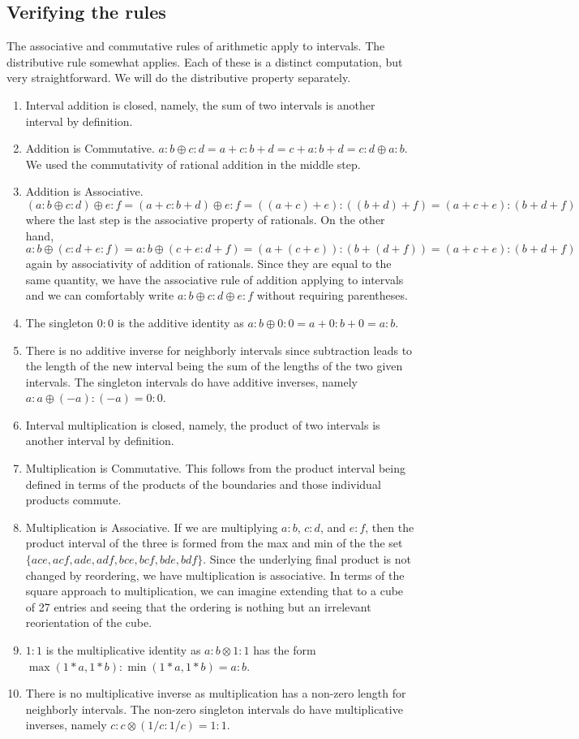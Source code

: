 \documentclass[12pt]{article}
\theoremstyle{remark}
\begin{document}
\subsection{Verifying the rules}\label{sec:rules}

The associative and commutative rules of arithmetic apply to intervals. The distributive rule somewhat applies. Each of these is a distinct computation, but very straightforward. We will do the distributive property separately. 

\begin{enumerate}
    \item Interval addition is closed, namely, the sum of two intervals is another interval by definition. 
    \item Addition is Commutative. $a:b \oplus c:d= a+c : b+d = c+a:b+d = c:d \oplus a:b$. We used the commutativity of rational addition in the middle step. 
    \item Addition is Associative. $(a:b \oplus c:d) \oplus e:f = (a+c:b+d) \oplus e:f = ((a+c)+e):((b+d)+f) = (a+c+e):(b+d+f)$ where the last step is the associative property of rationals.  On the other hand, $a:b \oplus (c:d+e:f) = a:b \oplus (c+e:d+f) = (a+(c+e)):(b+(d+f)) = (a+c+e):(b+d+f)$ again by associativity of addition of rationals. Since they are equal to the same quantity, we have the associative rule of addition applying to intervals and we can comfortably write $a:b \oplus c:d \oplus e:f$ without requiring parentheses. 
    \item The singleton $0:0$ is the additive identity as $a:b \oplus 0:0 = a+0:b+0 = a:b$. 
    \item There is no additive inverse for neighborly intervals since subtraction leads to the length of the new interval being the sum of the lengths of the two given intervals. The singleton intervals do have additive inverses, namely $a:a \oplus (-a):(-a) = 0:0$. 
    \item Interval multiplication is closed, namely, the product of two intervals is another interval by definition. 
    \item Multiplication is Commutative. This follows from the product interval being defined in terms of the products of the boundaries and those individual products commute. 
    \item Multiplication is Associative. If we are multiplying $a:b$, $c:d$, and $e:f$, then the product interval of the three is formed from the max and min of the the set $\{ace, acf, ade, adf, bce, bcf, bde, bdf\}$. Since the underlying final product is not changed by reordering, we have multiplication is associative. In terms of the square approach to multiplication, we can imagine extending that to a cube of 27 entries and seeing that the ordering is nothing but an irrelevant reorientation of the cube. 
    \item $1:1$ is the multiplicative identity as $a:b \otimes 1:1$ has the form $\max(1*a, 1*b):\min(1*a, 1*b) = a:b$. 
    \item There is no multiplicative inverse as multiplication has a non-zero length for neighborly intervals. The non-zero singleton intervals do have multiplicative inverses, namely $c:c  \otimes  (1/c : 1/c) = 1:1$.
\end{enumerate}
\end{document}
